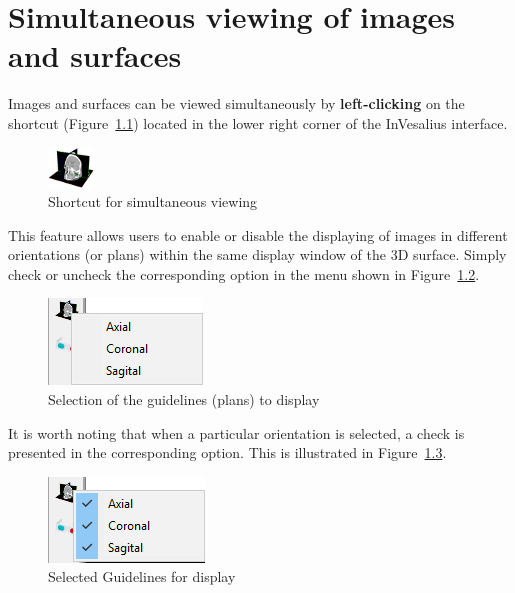 \chapter{Simultaneous viewing of images and surfaces}

Images and surfaces can be viewed simultaneously by \textbf{left-clicking} on the shortcut (Figure~\ref{fig:slice_plane_original}) located in the lower right corner of the InVesalius interface.

\begin{figure}[!htb]
\centering
\includegraphics[scale=0.6]{../user_guide_figures/icons/slice_plane_original.png}
\caption{Shortcut for simultaneous viewing}
\label{fig:slice_plane_original}
\end{figure}

This feature allows users to enable or disable the displaying of images in different orientations (or plans) within the same display window of the 3D surface. Simply check or uncheck the corresponding option in the menu shown in Figure~\ref{fig:view_2d_3d_1}.

\begin{figure}[!htb]
\centering
\includegraphics[scale=0.6]{../user_guide_figures/invesalius_screen/view_2d_3d_1_en.png}
\caption{Selection of the guidelines (plans) to display}
\label{fig:view_2d_3d_1}
\end{figure}

It is worth noting that when a particular orientation is selected, a check is presented in the corresponding option. This is illustrated in Figure~\ref{fig:view_2d_3d_2}.

\begin{figure}[!htb]
\centering
\includegraphics[scale=0.6]{../user_guide_figures/invesalius_screen/view_2d_3d_2_en.png}
\caption{Selected Guidelines for display}
\label{fig:view_2d_3d_2}
\end{figure}

